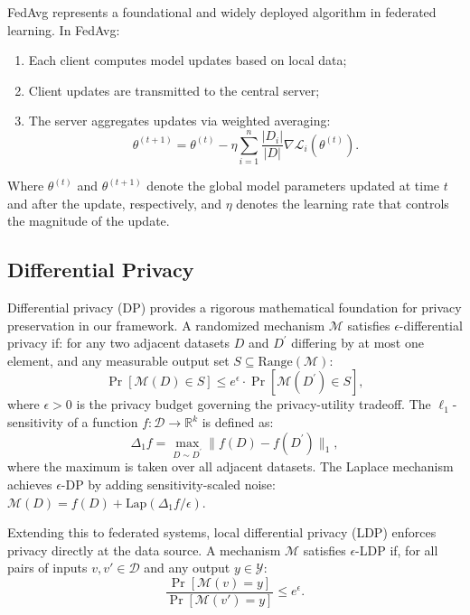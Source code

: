 \documentclass[journal,twoside,web]{ieeecolor}
\begin{document}
FedAvg\cite{fedavg} represents a foundational and widely deployed algorithm in federated learning. In FedAvg:
\begin{enumerate}
    \item Each client computes model updates based on local data;
    \item Client updates are transmitted to the central server;
    \item The server aggregates updates via weighted averaging:
    \begin{equation}
    \theta^{(t+1)} = \theta^{(t)} - \eta \sum_{i=1}^{n} \frac{|D_i|}{|D|} \nabla \mathcal{L}_i (\theta^{(t)}).
    \label{eq:fedavg}
    \end{equation}
\end{enumerate}

Where $\theta^{(t)}$ and $\theta^{(t+1)}$ denote the global model parameters updated at time $t$ and after the update, respectively, and $\eta$ denotes the learning rate that controls the magnitude of the update.

\subsection{Differential Privacy}

Differential privacy (DP) \cite{dp} provides a rigorous mathematical foundation for privacy preservation in our framework. A randomized mechanism \(\mathcal{M}\) satisfies \(\epsilon\)-differential privacy if: for any two adjacent datasets \(D\) and \(D^{\prime}\) differing by at most one element, and any measurable output set \(S \subseteq \text{Range}(\mathcal{M}):\) 
\begin{equation}
\Pr[\mathcal{M}(D) \in S] \leq e^{\epsilon} \cdot \Pr[\mathcal{M}(D^{\prime}) \in S],
\label{eq:dp_def}
\end{equation}
where \(\epsilon > 0\) is the privacy budget governing the privacy-utility tradeoff. The \(\ell_1\)-sensitivity of a function \(f: \mathcal{D} \rightarrow \mathbb{R}^{k}\) is defined as:
\begin{equation}
\Delta_{1} f = \max_{D \sim D^{\prime}} \|f(D) - f(D^{\prime})\|_{1},
\label{eq:sensitivity}
\end{equation}
where the maximum is taken over all adjacent datasets. The Laplace mechanism achieves \(\epsilon\)-DP by adding sensitivity-scaled noise: \(\mathcal{M}(D) = f(D) + \text{Lap}(\Delta_{1} f / \epsilon)\).

Extending this to federated systems, local differential privacy (LDP) \cite{dpprotocols} enforces privacy directly at the data source. A mechanism \(\mathcal{M}\) satisfies \(\epsilon\)-LDP if, for all pairs of inputs \(v, v' \in \mathcal{D}\) and any output \(y \in \mathcal{Y}\):
\begin{equation}
\frac{\Pr[\mathcal{M}(v) = y]}{\Pr[\mathcal{M}(v') = y]} \leq e^{\epsilon}.
\label{eq:ldp_def}
\end{equation}
\end{document}
